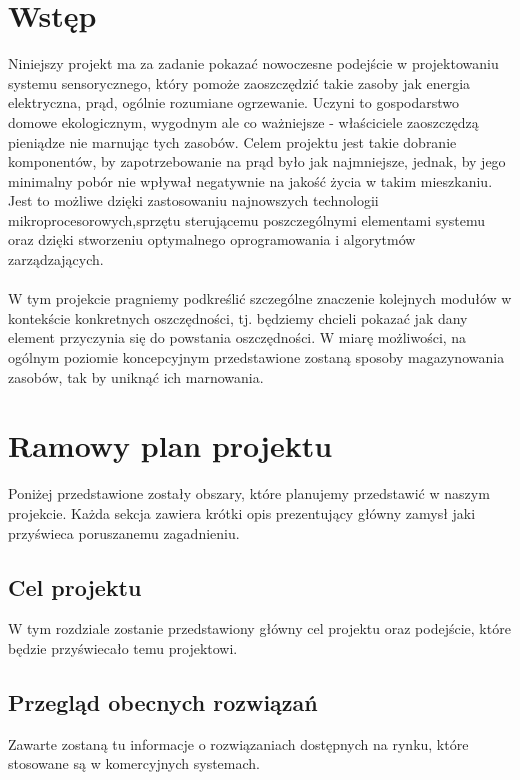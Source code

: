 \documentclass[12pt]{article} %
\begin{document}
\newpage %


\section{Wstęp} 

Niniejszy projekt ma za zadanie pokazać nowoczesne podejście w projektowaniu systemu sensorycznego, który pomoże zaoszczędzić takie zasoby jak energia elektryczna, prąd, ogólnie rozumiane ogrzewanie. Uczyni to gospodarstwo domowe ekologicznym, wygodnym ale co ważniejsze - właściciele zaoszczędzą pieniądze nie marnując tych zasobów. Celem projektu jest takie dobranie komponentów, by zapotrzebowanie na prąd było jak najmniejsze, jednak, by jego minimalny pobór nie wpływał negatywnie na jakość życia w takim mieszkaniu. Jest to możliwe dzięki zastosowaniu najnowszych technologii mikroprocesorowych,sprzętu sterującemu poszczególnymi elementami systemu oraz dzięki stworzeniu optymalnego oprogramowania i algorytmów zarządzających.
\\ \\
W tym projekcie pragniemy podkreślić szczególne znaczenie kolejnych modułów w kontekście konkretnych oszczędności, tj. będziemy chcieli pokazać jak dany element przyczynia się do powstania oszczędności. W miarę możliwości, na ogólnym poziomie koncepcyjnym przedstawione zostaną sposoby magazynowania zasobów, tak by uniknąć ich marnowania. 

\section{Ramowy plan projektu}
Poniżej przedstawione zostały obszary, które planujemy przedstawić w naszym projekcie. Każda sekcja zawiera krótki opis prezentujący główny zamysł jaki przyświeca poruszanemu zagadnieniu.

\subsection{Cel projektu}
W tym rozdziale zostanie przedstawiony główny cel projektu oraz podejście, które będzie przyświecało temu projektowi.

\subsection{Przegląd obecnych rozwiązań}
Zawarte zostaną tu informacje o rozwiązaniach dostępnych na rynku, które stosowane są w komercyjnych systemach.
\end{document}
